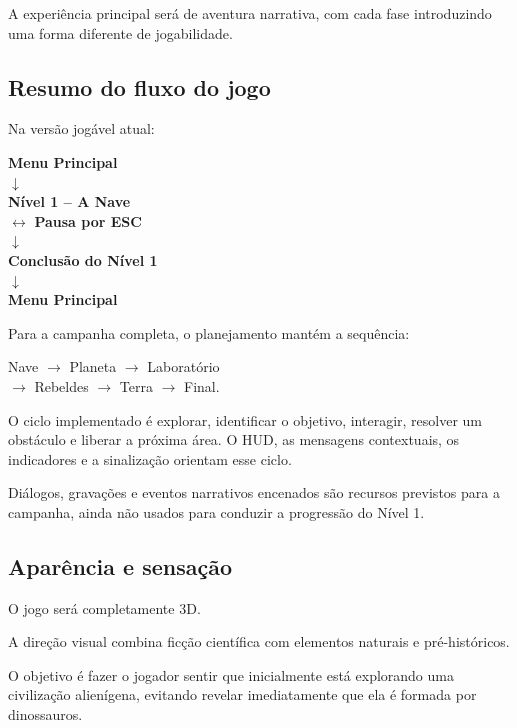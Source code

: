 \documentclass[12pt,a4paper]{article}
\begin{document}
A experiência principal será de aventura narrativa, com cada fase
introduzindo uma forma diferente de jogabilidade.

\subsection{Resumo do fluxo do jogo}

Na versão jogável atual:

\begin{center}
\textbf{Menu Principal}\\
$\downarrow$\\
\textbf{Nível 1 -- A Nave}\\
$\leftrightarrow$ \textbf{Pausa por ESC}\\
$\downarrow$\\
\textbf{Conclusão do Nível 1}\\
$\downarrow$\\
\textbf{Menu Principal}
\end{center}

Para a campanha completa, o planejamento mantém a sequência:

\begin{center}
Nave $\rightarrow$ Planeta $\rightarrow$ Laboratório\\
$\rightarrow$ Rebeldes $\rightarrow$ Terra $\rightarrow$ Final.
\end{center}

O ciclo implementado é explorar, identificar o objetivo, interagir,
resolver um obstáculo e liberar a próxima área. O HUD, as mensagens
contextuais, os indicadores e a sinalização orientam esse ciclo.

Diálogos, gravações e eventos narrativos encenados são recursos
previstos para a campanha, ainda não usados para conduzir a
progressão do Nível 1.



\subsection{Aparência e sensação}

O jogo será completamente 3D.

A direção visual combina ficção científica com elementos naturais e
pré-históricos.

O objetivo é fazer o jogador sentir que inicialmente está explorando
uma civilização alienígena, evitando revelar imediatamente que ela é
formada por dinossauros.
\end{document}
